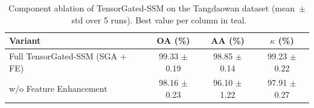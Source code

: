 \begin{table}[htbp]
  \centering
  \caption{Component ablation of TensorGated-SSM on the Tangdaowan dataset (mean~$\pm$~std over 5 runs). Best value per column in \textcolor{tgteal}{teal}.}
  \label{tab:ablation_tangdaowan}
  \begin{tabular}{l c c c}
    \toprule
    Variant & OA (\%) & AA (\%) & $\kappa$ (\%) \\
    \midrule
    Full TensorGated-SSM (SGA + FE) & \textcolor{tgteal}{99.33 $\pm$ 0.19} & \textcolor{tgteal}{98.85 $\pm$ 0.14} & \textcolor{tgteal}{99.23 $\pm$ 0.22} \\
    w/o Feature Enhancement & 98.16 $\pm$ 0.23 & 96.10 $\pm$ 1.22 & 97.91 $\pm$ 0.27 \\
    \bottomrule
  \end{tabular}
\end{table}
